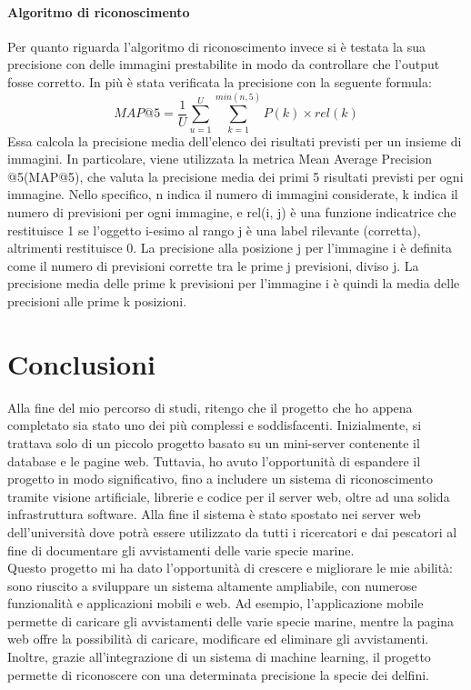 \documentclass[a4paper,final,12pt]{report}
\begin{document}
\subsubsection{Algoritmo di riconoscimento}
Per quanto riguarda l'algoritmo di riconoscimento invece si è testata la sua precisione con delle immagini prestabilite in modo da controllare che l'output fosse corretto.
In più è stata verificata la precisione con la seguente formula:
\begin{equation}
MAP@5 = \frac{1}{U} \sum_{u=1}^{U} \sum_{k=1}^{min(n,5)} P(k) \times rel(k)
\end{equation}
Essa calcola la precisione media dell'elenco dei risultati previsti per un insieme di immagini. In particolare, viene utilizzata la metrica Mean Average Precision @5(MAP@5), che valuta la precisione media dei primi 5 risultati previsti per ogni immagine.
Nello specifico, n indica il numero di immagini considerate, k indica il numero di previsioni per ogni immagine, e rel(i, j) è una funzione indicatrice che restituisce 1 se l'oggetto i-esimo al rango j è una label rilevante (corretta), altrimenti restituisce 0.
La precisione alla posizione j per l'immagine i è definita come il numero di previsioni corrette tra le prime j previsioni, diviso j. La precisione media delle prime k previsioni per l'immagine i è quindi la media delle precisioni alle prime k posizioni.

\chapter{Conclusioni}
Alla fine del mio percorso di studi, ritengo che il progetto che ho appena completato sia stato uno dei più complessi e soddisfacenti. Inizialmente, si trattava solo di un piccolo progetto basato su un mini-server contenente il database e le pagine web. Tuttavia, ho avuto l'opportunità di espandere il progetto in modo significativo, fino a includere un sistema di riconoscimento tramite visione artificiale, librerie e codice per il server web, oltre ad una solida infrastruttura software. Alla fine il sistema è stato spostato nei server web dell'università dove potrà essere utilizzato da tutti i ricercatori e dai pescatori al fine di documentare gli avvistamenti delle varie specie marine.\\

Questo progetto mi ha dato l'opportunità di crescere e migliorare le mie abilità: sono riuscito a sviluppare un sistema altamente ampliabile, con numerose funzionalità e applicazioni mobili e web. Ad esempio, l'applicazione mobile permette di caricare gli avvistamenti delle varie specie marine, mentre la pagina web offre la possibilità di caricare, modificare ed eliminare gli avvistamenti. Inoltre, grazie all'integrazione di un sistema di machine learning, il progetto permette di riconoscere con una determinata precisione la specie dei delfini.\\
\end{document}
